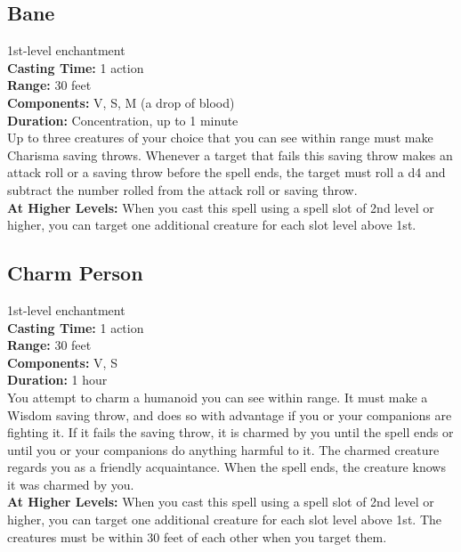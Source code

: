 \documentclass[11pt, A4paper, english]{article}
\begin{document}
		\subsection{Bane}
1st-level enchantment \\
\textbf{Casting Time:} 1 action \\
\textbf{Range:} 30 feet \\
\textbf{Components:} V, S, M (a drop of blood) \\
\textbf{Duration:} Concentration, up to 1 minute \\
Up to three creatures of your choice that you can see within range must make Charisma saving throws. Whenever a target that fails this saving throw makes an attack roll or a saving throw before the spell ends, the target must roll a d4 and subtract the number rolled from the attack roll or saving throw. \\
\textbf{At Higher Levels:} When you cast this spell using a spell slot of 2nd level or higher, you can target one additional creature for each slot level above 1st.

		\subsection{Charm Person}
1st-level enchantment \\
\textbf{Casting Time:} 1 action \\
\textbf{Range:} 30 feet \\
\textbf{Components:} V, S \\
\textbf{Duration:} 1 hour \\
You attempt to charm a humanoid you can see within range. It must make a Wisdom saving throw, and does so with advantage if you or your companions are fighting it. If it fails the saving throw, it is charmed by you until the spell ends or until you or your companions do anything harmful to it. The charmed creature regards you as a friendly acquaintance. When the spell ends, the creature knows it was charmed by you. \\
\textbf{At Higher Levels:} When you cast this spell using a spell slot of 2nd level or higher, you can target one additional creature for each slot level above 1st. The creatures must be within 30 feet of each other when you target them.
\end{document}
